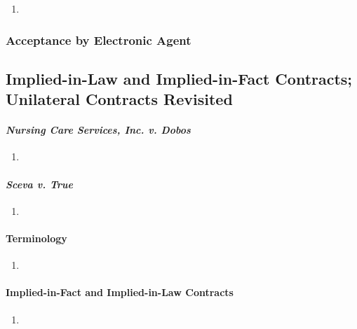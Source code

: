 \begin{enumerate}
    \item %
\end{enumerate}

\subsubsection{Acceptance by Electronic Agent}


\subsection{Implied-in-Law and Implied-in-Fact Contracts; Unilateral Contracts 
Revisited}

\paragraph{\emph{Nursing Care Services, Inc. v. Dobos}}

\begin{enumerate}
    \item %
\end{enumerate}

\paragraph{\emph{Sceva v. True}}

\begin{enumerate}
    \item %
\end{enumerate}

\paragraph{Terminology}

\begin{enumerate}
    \item %
\end{enumerate}

\paragraph{Implied-in-Fact and Implied-in-Law Contracts}

\begin{enumerate}
    \item %
\end{enumerate}

